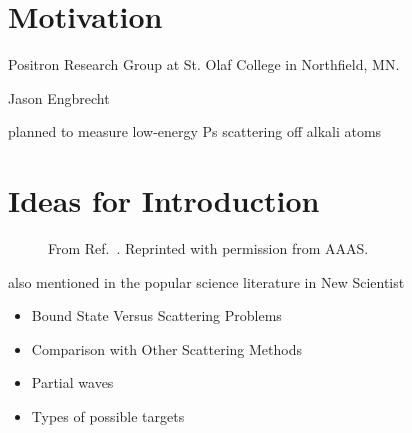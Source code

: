 \documentclass[Dissertation.tex]{subfiles}
\begin{document}
\section{Motivation}
Positron Research Group at St. Olaf College in Northfield, MN.

Jason Engbrecht

planned to measure low-energy Ps scattering off alkali atoms


\section{Ideas for Introduction}

\begin{figure}[H]
	\centering
	\caption{From Ref.~\cite{Brawley2010a}. Reprinted with permission from AAAS.}
	\label{fig:ScienceBrawley}
\end{figure}

also mentioned in the popular science literature in New Scientist \cite{NewScientist2015}

\begin{itemize}
	\item Bound State Versus Scattering Problems
	\item Comparison with Other Scattering Methods
	\item Partial waves
	\item Types of possible targets
\end{itemize}

\end{document}

